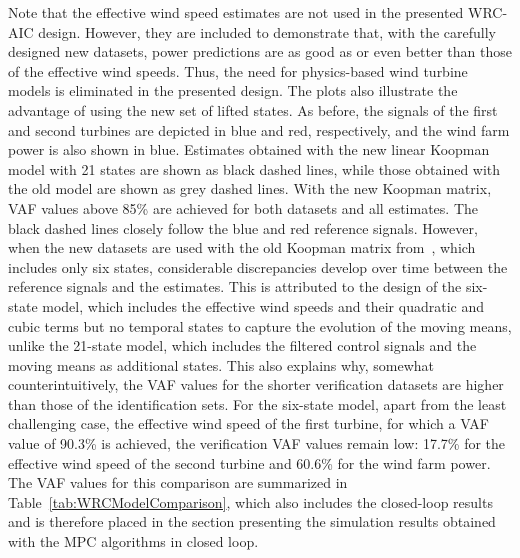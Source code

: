 Note that the effective wind speed estimates are not used in the presented WRC-AIC design. However, they are included to demonstrate that, with the carefully designed new datasets, power predictions are as good as or even better than those of the effective wind speeds. Thus, the need for physics-based wind turbine models is eliminated in the presented design. The plots also illustrate the advantage of using the new set of lifted states. As before, the signals of the first and second turbines are depicted in blue and red, respectively, and the wind farm power is also shown in blue. Estimates obtained with the new linear Koopman model with 21 states are shown as black dashed lines, while those obtained with the old model are shown as grey dashed lines. With the new Koopman matrix, VAF values above 85\% are achieved for both datasets and all estimates. The black dashed lines closely follow the blue and red reference signals. However, when the new datasets are used with the old Koopman matrix from~\cite{dittmer2023koopman}, which includes only six states, considerable discrepancies develop over time between the reference signals and the estimates. This is attributed to the design of the six-state model, which includes the effective wind speeds and their quadratic and cubic terms but no temporal states to capture the evolution of the moving means, unlike the 21-state model, which includes the filtered control signals and the moving means as additional states. This also explains why, somewhat counterintuitively, the VAF values for the shorter verification datasets are higher than those of the identification sets. For the six-state model, apart from the least challenging case, the effective wind speed of the first turbine, for which a VAF value of 90.3\% is achieved, the verification VAF values remain low: 17.7\% for the effective wind speed of the second turbine and 60.6\% for the wind farm power. The VAF values for this comparison are summarized in Table~\ref{tab:WRCModelComparison}, which also includes the closed-loop results and is therefore placed in the section presenting the simulation results obtained with the MPC algorithms in closed loop.

